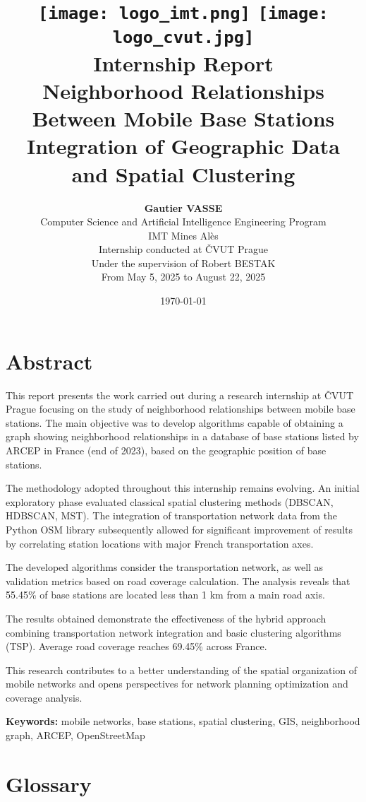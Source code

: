 \documentclass[12pt,a4paper]{report}
\title{
    \texttt{[image: logo\_imt.png]} \hfill \texttt{[image: logo\_cvut.jpg]} \\[2cm]
    \textbf{\Large Internship Report} \\[0.5cm]
    \Huge Neighborhood Relationships Between Mobile Base Stations \\[0.3cm]
    \Large Integration of Geographic Data and Spatial Clustering
}
\author{
    \textbf{Gautier VASSE} \\[0.3cm]
    Computer Science and Artificial Intelligence Engineering Program \\
    IMT Mines Alès \\[0.5cm]
    Internship conducted at ČVUT Prague \\
    Under the supervision of Robert BESTAK \\[0.3cm]
    From May 5, 2025 to August 22, 2025
}
\date{\today}
\begin{document}
\maketitle
\thispagestyle{empty}



\newpage

\tableofcontents

\newpage

\chapter*{Abstract}

This report presents the work carried out during a research internship at ČVUT Prague focusing on the study of neighborhood relationships between mobile base stations. The main objective was to develop algorithms capable of obtaining a graph showing neighborhood relationships in a database of base stations listed by ARCEP in France (end of 2023), based on the geographic position of base stations.

The methodology adopted throughout this internship remains evolving. An initial exploratory phase evaluated classical spatial clustering methods (DBSCAN, HDBSCAN, MST). The integration of transportation network data from the Python OSM library subsequently allowed for significant improvement of results by correlating station locations with major French transportation axes.

The developed algorithms consider the transportation network, as well as validation metrics based on road coverage calculation. The analysis reveals that 55.45\% of base stations are located less than 1 km from a main road axis.

The results obtained demonstrate the effectiveness of the hybrid approach combining transportation network integration and basic clustering algorithms (TSP). Average road coverage reaches 69.45\% across France.

This research contributes to a better understanding of the spatial organization of mobile networks and opens perspectives for network planning optimization and coverage analysis.

\textbf{Keywords:} mobile networks, base stations, spatial clustering, GIS, neighborhood graph, ARCEP, OpenStreetMap

\newpage

\chapter*{Glossary}
\end{document}
